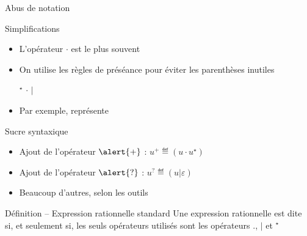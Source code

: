 
\begingroup

\begin{frame}{Abus de notation}
  \begin{block}{Simplifications}
    \begin{itemize}
    \item L'opérateur \alert{$\cdot$} est le plus souvent 
    \item On utilise les règles de \alert{préséance} pour éviter les parenthèses inutiles
      \begin{center}
         \alert{${}^\star$} \hspace{1cm}
         \alert{$\cdot$} \hspace{1cm}
         \alert{$|$}
      \end{center}
      \item Par exemple,  représente 
    \end{itemize}
  \end{block}

  \begin{block}{Sucre syntaxique}
    \begin{itemize}
    \item Ajout de  l'opérateur $\alert{+}$ : $u^+ \eqdef (u \cdot u^\star)$
    \item Ajout de  l'opérateur $\alert{?}$ : $u^? \eqdef ( u | \varepsilon)$
    \item Beaucoup d'autres, selon les outils
    \end{itemize}
  \end{block}

  \begin{block}{Définition -- Expression rationnelle standard}
    Une expression rationnelle est dite 
    si, et seulement si, les seuls opérateurs utilisés sont les opérateurs $.$, $|$ et ${}^\star$
  \end{block}
\end{frame}


\endgroup
